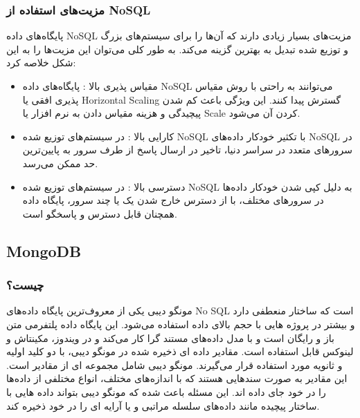 \subsubsection{مزیت‌های استفاده از NoSQL}
پایگاه‌های داده NoSQL مزیت‌های بسیار زیادی دارند که آن‌ها را برای سیستم‌های بزرگ و توزیع شده تبدیل به بهترین گزینه می‌کند. به طور کلی می‌توان این مزیت‌ها را به این شکل خلاصه کرد:
\begin{itemize}
	\item
مقیاس پذیری 
بالا
: پایگاه‌های داده NoSQL می‌توانند به راحتی با روش مقیاس پذیری افقی یا Horizontal Scaling گسترش پیدا کنند. این ویژگی باعث کم شدن پیچیدگی و هزینه مقیاس دادن به نرم افزار یا Scale کردن آن می‌شود.
\item
کارایی 
بالا
: در سیستم‌های توزیع شده NoSQL با تکثیر خودکار داده‌های NoSQL در سرورهای متعدد در سراسر دنیا، تاخیر در ارسال پاسخ از طرف سرور به پایین‌ترین حد ممکن می‌رسد.
\item
دسترسی 
بالا
: در سیستم‌های توزیع شده NoSQL به دلیل کپی شدن خودکار داده‌ها در سرورهای مختلف، با از دسترس خارج شدن یک یا چند سرور، پایگاه داده همچنان قابل دسترس و پاسخگو است.
\end{itemize}

\subsection{MongoDB}
\subsubsection{ چیست؟}
مونگو دیبی
 یکی از معروف‌ترین پایگاه داده‌های No SQL است که ساختار منعطفی دارد و بیشتر در پروژه هایی با حجم بالای داده استفاده می‌شود. این پایگاه داده پلتفرمی متن باز و رایگان است و با مدل داده‌های مستند گرا
 کار می‌کند و در ویندوز، مکینتاش و لینوکس قابل استفاده است. مقادیر داده ای ذخیره شده در مونگو دیبی، با دو کلید اولیه
 و ثانویه
  مورد استفاده قرار می‌گیرند.
مونگو دیبی شامل مجموعه ای از مقادیر است. این مقادیر به صورت سندهایی هستند که با اندازه‌های مختلف، انواع مختلفی از داده‌ها را در خود جای داده اند. این مسئله باعث شده که مونگو دیبی بتواند داده هایی با ساختار پیچیده مانند داده‌های سلسله مراتبی و یا آرایه ای را در خود ذخیره کند.

